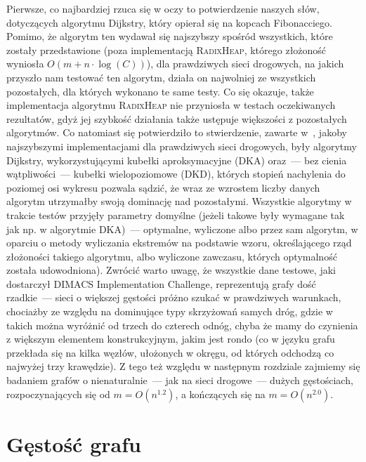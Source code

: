 Pierwsze, co najbardziej rzuca się w oczy to potwierdzenie naszych słów, dotyczących algorytmu Dijkstry, który opierał się na kopcach Fibonacciego. Pomimo, że algorytm ten wydawał się najszybszy spośród wszystkich, które zostały przedstawione (poza implementacją \textsc{RadixHeap}, którego złożoność wyniosła $ O \left( m + n \cdot \log \left( C\right) \right)$), dla prawdziwych sieci drogowych, na jakich przyszło nam testować ten algorytm, działa on najwolniej ze wszystkich pozostałych, dla których wykonano te same testy. Co się okazuje, także implementacja algorytmu \textsc{RadixHeap} nie przyniosła w testach oczekiwanych rezultatów, gdyż jej szybkość działania także ustępuje większości z pozostałych algorytmów. Co natomiast się potwierdziło to stwierdzenie, zawarte w~\cite{GIDA}, jakoby najszybszymi implementacjami dla prawdziwych sieci drogowych, były algorytmy Dijkstry, wykorzystującymi kubełki aproksymacyjne (\textsc{DKA}) oraz~--- bez cienia wątpliwości~--- kubełki wielopoziomowe (\textsc{DKD}), których stopień nachylenia do poziomej osi wykresu pozwala sądzić, że wraz ze wzrostem liczby danych algorytm utrzymałby swoją dominację nad pozostałymi. Wszystkie algorytmy w trakcie testów przyjęły parametry domyślne (jeżeli takowe były wymagane tak jak np. w algorytmie \textsc{DKA})~--- optymalne, wyliczone albo przez sam algorytm, w oparciu o metody wyliczania ekstremów na podstawie wzoru, określającego rząd złożoności takiego algorytmu, albo wyliczone zawczasu, których optymalność została udowodniona). Zwrócić warto uwagę, że wszystkie dane testowe, jaki dostarczył \textsf{DIMACS Implementation Challenge}, reprezentują grafy dość rzadkie~--- sieci o większej gęstości próżno szukać w prawdziwych warunkach, chociażby ze względu na dominujące typy skrzyżowań samych dróg, gdzie w takich można wyróżnić od trzech do czterech odnóg, chyba że mamy do czynienia z większym elementem konstrukcyjnym, jakim jest rondo (co w języku grafu przekłada się na kilka węzłów, ułożonych w okręgu, od których odchodzą co najwyżej trzy krawędzie). Z tego też względu w następnym rozdziale zajmiemy się badaniem grafów o nienaturalnie~--- jak na sieci drogowe~--- dużych gęstościach, rozpoczynających się od $m = O \left( n^{1.2} \right)$, a kończących się na $m = O \left( n^{2.0} \right)$.

\section{Gęstość grafu}

